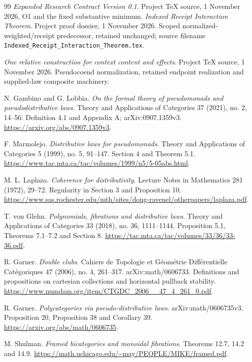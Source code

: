 \documentclass[11pt,a4paper]{article}
\theoremstyle{definition}
\begin{document}
\begin{thebibliography}{99}
\emph{Expanded Research Contract Version 0.1}. Project TeX source,
1 November 2026, O1 and the fixed substantive minimum. 
\emph{Indexed Receipt Interaction Theorem}. Project proof dossier,
1 November 2026. Scoped normalized-weighted/receipt predecessor, retained
unchanged; source filename \texttt{Indexed\_Receipt\_Interaction\_Theorem.tex}.

\emph{One relative construction for context content and effects}. Project
TeX source, 1 November 2026. Pseudocoend normalization, retained endpoint realization and supplied-law
composite machinery.

N. Gambino and G. Lobbia. \emph{On the formal theory of pseudomonads and
pseudodistributive laws}. Theory and Applications of Categories 37 (2021),
no. 2, 14--56. Definition 4.1 and Appendix A; arXiv:0907.1359v3.
\url{https://arxiv.org/abs/0907.1359v3}.

F. Marmolejo. \emph{Distributive laws for pseudomonads}. Theory and
Applications of Categories 5 (1999), no. 5, 91--147. Section 4 and Theorem 5.1.
\url{https://www.tac.mta.ca/tac/volumes/1999/n5/5-05abs.html}.

M. L. Laplaza. \emph{Coherence for distributivity}. Lecture Notes in
Mathematics 281 (1972), 29--72. Regularity in Section 3 and Proposition 10.
\url{https://www.sas.rochester.edu/mth/sites/doug-ravenel/otherpapers/laplaza.pdf}.

T. von Glehn. \emph{Polynomials, fibrations and distributive laws}. Theory
and Applications of Categories 33 (2018), no. 36, 1111--1144.
Proposition 5.1, Theorems 7.1--7.2 and Section 8.
\url{https://tac.mta.ca/tac/volumes/33/36/33-36.pdf}.

R. Garner. \emph{Double clubs}. Cahiers de Topologie et G\'eom\'etrie
Diff\'erentielle Cat\'egoriques 47 (2006), no. 4, 261--317.
arXiv:math/0606733. Definitions and propositions on cartesian collections and
horizontal pullback stability.
\url{https://www.numdam.org/item/CTGDC_2006__47_4_261_0.pdf}.

R. Garner. \emph{Polycategories via pseudo-distributive laws}.
arXiv:math/0606735v3. Proposition 20, Proposition 38 and Corollary 39.
\url{https://arxiv.org/abs/math/0606735}.

M. Shulman. \emph{Framed bicategories and monoidal fibrations}.
Theorems 12.7, 14.2 and 14.9.
\url{https://math.uchicago.edu/~may/PEOPLE/MIKE/framed.pdf}.


\end{thebibliography}
\end{document}
